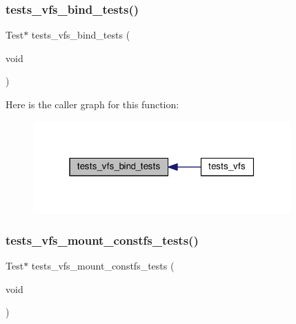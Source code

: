 \subsubsection{\texorpdfstring{tests\+\_\+vfs\+\_\+bind\+\_\+tests()}{tests\_vfs\_bind\_tests()}}
{\footnotesize\ttfamily Test$\ast$ tests\+\_\+vfs\+\_\+bind\+\_\+tests (\begin{DoxyParamCaption}\item[{void}]{ }\end{DoxyParamCaption})}

Here is the caller graph for this function\+:
\nopagebreak
\begin{figure}[H]
\begin{center}
\leavevmode
\includegraphics[width=280pt]{tests-vfs_8c_a93aa0948d1133fbb161d95ab38a0a19f_icgraph}
\end{center}
\end{figure}
\mbox{\label{tests-vfs_8c_a15914761731ece3546c1f4ae3b262c58}} 
\subsubsection{\texorpdfstring{tests\+\_\+vfs\+\_\+mount\+\_\+constfs\+\_\+tests()}{tests\_vfs\_mount\_constfs\_tests()}}
{\footnotesize\ttfamily Test$\ast$ tests\+\_\+vfs\+\_\+mount\+\_\+constfs\+\_\+tests (\begin{DoxyParamCaption}\item[{void}]{ }\end{DoxyParamCaption})}

